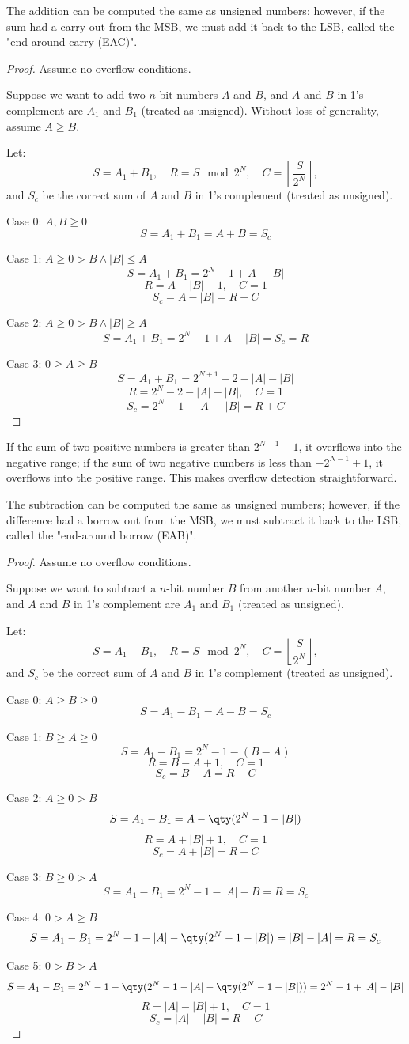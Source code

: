 \documentclass[a4paper,12pt]{report}
\begin{document}
The addition can be computed the same as unsigned numbers; however, if the sum had a carry out from the MSB, we must add it back to the LSB, called the "end-around carry (EAC)".
\begin{proof}
Assume no overflow conditions.

Suppose we want to add two $n$-bit numbers $A$ and $B$, and $A$ and $B$ in 1's complement are $A_1$ and $B_1$ (treated as unsigned). Without loss of generality, assume $A\geq B$.

Let:
\[S = A_1 + B_1,\quad R=S \mod 2^N, \quad C=\left\lfloor\frac{S}{2^N}\right\rfloor,\]
and $S_c$ be the correct sum of $A$ and $B$ in 1's complement (treated as unsigned).

Case 0: $A,B\geq 0$
\[S =A_1+B_1=A+B=S_c\]

Case 1: $A\geq 0>B\land |B|\leq A$
\[S =A_1+B_1=2^N-1+A-|B|\]
\[R=A-|B|-1,\quad C=1\]
\[S_c=A-|B|=R+C\]

Case 2: $A\geq 0>B\land |B|\geq A$
\[S =A_1+B_1=2^N-1+A-|B|=S_c=R\]

Case 3: $0\geq A\geq B$
\[S=A_1+B_1=2^{N+1}-2-|A|-|B|\]
\[R=2^N-2-|A|-|B|,\quad C=1\]
\[S_c=2^N-1-|A|-|B|=R+C\]
\end{proof}

If the sum of two positive numbers is greater than $2^{N-1}-1$, it overflows into the negative range; if the sum of two negative numbers is less than $-2^{N-1}+1$, it overflows into the positive range. This makes overflow detection straightforward.

The subtraction can be computed the same as unsigned numbers; however, if the difference had a borrow out from the MSB, we must subtract it back to the LSB, called the "end-around borrow (EAB)".
\begin{proof}
Assume no overflow conditions.

Suppose we want to subtract a $n$-bit number $B$ from another $n$-bit number $A$, and $A$ and $B$ in 1's complement are $A_1$ and $B_1$ (treated as unsigned).

Let:
\[S = A_1 - B_1,\quad R=S \mod 2^N, \quad C=\left\lfloor\frac{S}{2^N}\right\rfloor,\]
and $S_c$ be the correct sum of $A$ and $B$ in 1's complement (treated as unsigned).

Case 0: $A\geq B\geq 0$
\[S=A_1-B_1=A-B=S_c\]

Case 1: $B\geq A\geq 0$
\[S=A_1-B_1=2^N-1-(B-A)\]
\[R=B-A+1,\quad C=1\]
\[S_c=B-A=R-C\]

Case 2: $A\geq 0>B$
\[S=A_1-B_1=A-\qty(2^N-1-|B|)\]
\[R=A+|B|+1,\quad C=1\]
\[S_c=A+|B|=R-C\]

Case 3: $B\geq 0>A$
\[S=A_1-B_1=2^N-1-|A|-B=R=S_c\]

Case 4: $0>A\geq B$
\[S=A_1-B_1=2^N-1-|A|-\qty(2^N-1-|B|)=|B|-|A|=R=S_c\]

Case 5: $0>B>A$
\[S=A_1-B_1=2^N-1-\qty(2^N-1-|A|-\qty(2^N-1-|B|))=2^N-1+|A|-|B|\]
\[R=|A|-|B|+1,\quad C=1\]
\[S_c=|A|-|B|=R-C\]
\end{proof}
\end{document}
